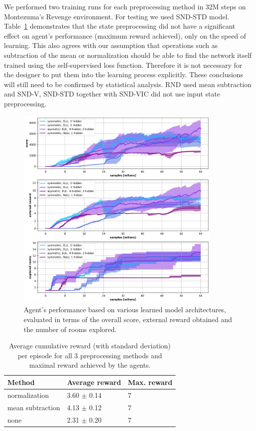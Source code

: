 \documentclass[a4paper,11pt]{elsarticle}
\begin{document}
We performed two training runs for each preprocessing method in 32M steps on Montezuma's Revenge environment. For testing we used SND-STD model. Table~\ref{tab:res1} demonstrates that the state preprocessing did not have a significant effect on agent's performance (maximum reward achieved), only on the speed of learning. This also agrees with our assumption that operations such as subtraction of the mean or normalization should be able to find the network itself trained using the self-supervised loss function. Therefore it is not necessary for the designer to put them into the learning process explicitly. These conclusions will still need to be confirmed by statistical analysis. RND used mean subtraction and SND-V, SND-STD together with SND-VIC did not use input state preprocessing.

\begin{figure}[t!]
\centering
\includegraphics[width=10cm]{fig/results/aux_experiments/cnd_vicreg_architecture.png}
\caption{Agent's performance based on various learned model architectures, evaluated in terms of the overall score, external reward obtained and the number of rooms explored.}
\label{img:result_cnd_learned_arch}
\end{figure}

\begin{table}[thb]
\scriptsize
\centering
\caption{Average cumulative reward (with standard deviation) per episode for all 3 preprocessing methods and maximal reward achieved by the agents.}
\begin{tabular}{l|ll}
Method & Average reward & Max. reward \\
\hline\hline
normalization    & 3.60 $\pm$ 0.14 & 7 \\ 
mean subtraction & 4.13 $\pm$ 0.12 & 7 \\
none & 2.31 $\pm$ 0.20 & 7 \\
\hline
\end{tabular}
\label{tab:res1}
\end{table}
\end{document}
